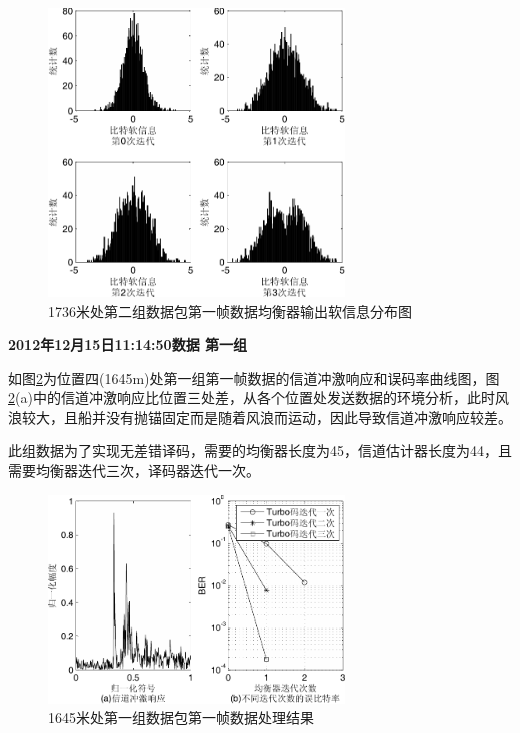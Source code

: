 \begin{figure}[htb]
  \begin{center}
    \includegraphics[width=0.7\textwidth]{images/softInfo_3_2.pdf}
  \end{center}
  \caption{1736米处第二组数据包第一帧数据均衡器输出软信息分布图}
  \label{fig:6.14s}
\end{figure}
\textbf{\sihao 2012年12月15日11:14:50数据 第一组} 

如图\ref{fig:6.15}为位置四(1645m)处第一组第一帧数据的信道冲激响应和误码率曲线图，图\ref{fig:6.15}(a)中的信道冲激响应比位置三处差，从各个位置处发送数据的环境分析，此时风浪较大，且船并没有抛锚固定而是随着风浪而运动，因此导致信道冲激响应较差。

此组数据为了实现无差错译码，需要的均衡器长度为45，信道估计器长度为44，且需要均衡器迭代三次，译码器迭代一次。

\begin{figure}[htb]
  \begin{center}
    \includegraphics[width=0.7\textwidth]{images/result_4_1_s.pdf}
  \end{center}
  \caption{1645米处第一组数据包第一帧数据处理结果}
  \label{fig:6.15}
\end{figure}

